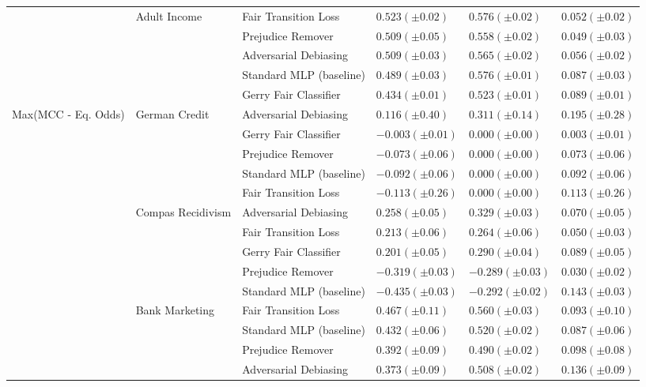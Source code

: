 \begin{tabular}{llllll}
\cline{2-6}
 & \multirow[t]{5}{*}{Adult Income} & Fair Transition Loss & $0.523 (\pm0.02)$ & $0.576 (\pm0.02)$ & $0.052 (\pm0.02)$ \\
 &  & Prejudice Remover & $0.509 (\pm0.05)$ & $0.558 (\pm0.02)$ & $0.049 (\pm0.03)$ \\
 &  & Adversarial Debiasing & $0.509 (\pm0.03)$ & $0.565 (\pm0.02)$ & $0.056 (\pm0.02)$ \\
 &  & Standard MLP (baseline) & $0.489 (\pm0.03)$ & $0.576 (\pm0.01)$ & $0.087 (\pm0.03)$ \\
 &  & Gerry Fair Classifier & $0.434 (\pm0.01)$ & $0.523 (\pm0.01)$ & $0.089 (\pm0.01)$ \\
\cline{1-6} \cline{2-6}
\multirow[t]{20}{*}{Max(MCC - Eq. Odds)} & \multirow[t]{5}{*}{German Credit} & Adversarial Debiasing & $0.116 (\pm0.40)$ & $0.311 (\pm0.14)$ & $0.195 (\pm0.28)$ \\
 &  & Gerry Fair Classifier & $-0.003 (\pm0.01)$ & $0.000 (\pm0.00)$ & $0.003 (\pm0.01)$ \\
 &  & Prejudice Remover & $-0.073 (\pm0.06)$ & $0.000 (\pm0.00)$ & $0.073 (\pm0.06)$ \\
 &  & Standard MLP (baseline) & $-0.092 (\pm0.06)$ & $0.000 (\pm0.00)$ & $0.092 (\pm0.06)$ \\
 &  & Fair Transition Loss & $-0.113 (\pm0.26)$ & $0.000 (\pm0.00)$ & $0.113 (\pm0.26)$ \\
\cline{2-6}
 & \multirow[t]{5}{*}{Compas Recidivism} & Adversarial Debiasing & $0.258 (\pm0.05)$ & $0.329 (\pm0.03)$ & $0.070 (\pm0.05)$ \\
 &  & Fair Transition Loss & $0.213 (\pm0.06)$ & $0.264 (\pm0.06)$ & $0.050 (\pm0.03)$ \\
 &  & Gerry Fair Classifier & $0.201 (\pm0.05)$ & $0.290 (\pm0.04)$ & $0.089 (\pm0.05)$ \\
 &  & Prejudice Remover & $-0.319 (\pm0.03)$ & $-0.289 (\pm0.03)$ & $0.030 (\pm0.02)$ \\
 &  & Standard MLP (baseline) & $-0.435 (\pm0.03)$ & $-0.292 (\pm0.02)$ & $0.143 (\pm0.03)$ \\
\cline{2-6}
 & \multirow[t]{5}{*}{Bank Marketing} & Fair Transition Loss & $0.467 (\pm0.11)$ & $0.560 (\pm0.03)$ & $0.093 (\pm0.10)$ \\
 &  & Standard MLP (baseline) & $0.432 (\pm0.06)$ & $0.520 (\pm0.02)$ & $0.087 (\pm0.06)$ \\
 &  & Prejudice Remover & $0.392 (\pm0.09)$ & $0.490 (\pm0.02)$ & $0.098 (\pm0.08)$ \\
 &  & Adversarial Debiasing & $0.373 (\pm0.09)$ & $0.508 (\pm0.02)$ & $0.136 (\pm0.09)$ \\

\end{tabular}
